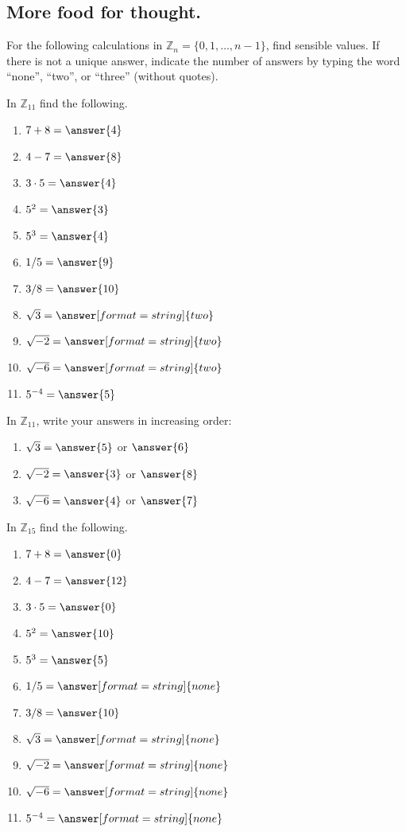 \documentclass[space,nooutcomes,handout]{ximera}
\begin{document}
\subsection*{More food for thought.}  For the following calculations in $\mathbb{Z}_{n} = \{0, 1, \dots, n-1\}$, find sensible values.  If there is not a unique answer, indicate the number of answers by typing the word ``none'', ``two'', or ``three'' (without quotes). 
\begin{problem}
In $\mathbb{Z}_{11}$ find the following. 
\begin{enumerate}
\item $7 + 8 =\answer{4}$
\item $4 - 7 =\answer{8}$
\item $3\cdot 5 =\answer{4}$
\item $5^2 =\answer{3}$
\item $5^3 =\answer{4}$ 
\item $1/5 =\answer{9}$
\item $3/8 =\answer{10}$ 
\item $\sqrt{3} =\answer[format=string]{two}$ %
\item $\sqrt{-2} =\answer[format=string]{two}$  %
\item $\sqrt{-6} =\answer[format=string]{two}$  %
\item  $5^{-4}  =\answer{5}$ 
\end{enumerate}
\begin{problem}
In $\mathbb{Z}_{11}$, write your answers in increasing order: 
\begin{enumerate}
\item $\sqrt{3} =\answer{5}$ or $\answer{6}$ %
\item $\sqrt{-2} =\answer{3}$ or $\answer{8}$  %
\item $\sqrt{-6} =\answer{4}$ or $\answer{7}$  %
\end{enumerate}
\end{problem}
\end{problem}

\begin{problem}
In $\mathbb{Z}_{15}$ find the following. 
\begin{enumerate}
\item $7 + 8 =\answer{0}$
\item $4 - 7 =\answer{12}$
\item $3\cdot 5 =\answer{0}$
\item $5^2 =\answer{10}$
\item $5^3 =\answer{5}$ 
\item $1/5 =\answer[format=string]{none}$
\item $3/8 =\answer{10}$ 
\item $\sqrt{3} =\answer[format=string]{none}$
\item $\sqrt{-2} =\answer[format=string]{none}$  
\item $\sqrt{-6} =\answer[format=string]{none}$  
\item  $5^{-4}  =\answer[format=string]{none}$ 
\end{enumerate}
\end{problem}
\end{document}
